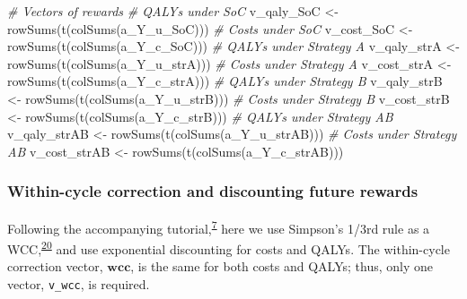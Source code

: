 \documentclass[
]{article}
\newenvironment{Shaded}{\begin{snugshade}}{\end{snugshade}}
\newcommand{\CommentTok}[1]{\textcolor[rgb]{0.56,0.35,0.01}{\textit{#1}}}
\newcommand{\FunctionTok}[1]{\textcolor[rgb]{0.00,0.00,0.00}{#1}}
\newcommand{\NormalTok}[1]{#1}
\newcommand{\OtherTok}[1]{\textcolor[rgb]{0.56,0.35,0.01}{#1}}
\begin{document}
\begin{Shaded}
\begin{Highlighting}[]
\CommentTok{\# Vectors of rewards}
\CommentTok{\# QALYs under SoC}
\NormalTok{v\_qaly\_SoC }\OtherTok{\textless{}{-}} \FunctionTok{rowSums}\NormalTok{(}\FunctionTok{t}\NormalTok{(}\FunctionTok{colSums}\NormalTok{(a\_Y\_u\_SoC)))}
\CommentTok{\# Costs under SoC}
\NormalTok{v\_cost\_SoC }\OtherTok{\textless{}{-}} \FunctionTok{rowSums}\NormalTok{(}\FunctionTok{t}\NormalTok{(}\FunctionTok{colSums}\NormalTok{(a\_Y\_c\_SoC)))}
\CommentTok{\# QALYs under Strategy A}
\NormalTok{v\_qaly\_strA }\OtherTok{\textless{}{-}} \FunctionTok{rowSums}\NormalTok{(}\FunctionTok{t}\NormalTok{(}\FunctionTok{colSums}\NormalTok{(a\_Y\_u\_strA)))}
\CommentTok{\# Costs under Strategy A}
\NormalTok{v\_cost\_strA }\OtherTok{\textless{}{-}} \FunctionTok{rowSums}\NormalTok{(}\FunctionTok{t}\NormalTok{(}\FunctionTok{colSums}\NormalTok{(a\_Y\_c\_strA)))}
\CommentTok{\# QALYs under Strategy B}
\NormalTok{v\_qaly\_strB }\OtherTok{\textless{}{-}} \FunctionTok{rowSums}\NormalTok{(}\FunctionTok{t}\NormalTok{(}\FunctionTok{colSums}\NormalTok{(a\_Y\_u\_strB)))}
\CommentTok{\# Costs under Strategy B}
\NormalTok{v\_cost\_strB }\OtherTok{\textless{}{-}} \FunctionTok{rowSums}\NormalTok{(}\FunctionTok{t}\NormalTok{(}\FunctionTok{colSums}\NormalTok{(a\_Y\_c\_strB)))}
\CommentTok{\# QALYs under Strategy AB}
\NormalTok{v\_qaly\_strAB }\OtherTok{\textless{}{-}} \FunctionTok{rowSums}\NormalTok{(}\FunctionTok{t}\NormalTok{(}\FunctionTok{colSums}\NormalTok{(a\_Y\_u\_strAB)))}
\CommentTok{\# Costs under Strategy AB}
\NormalTok{v\_cost\_strAB }\OtherTok{\textless{}{-}} \FunctionTok{rowSums}\NormalTok{(}\FunctionTok{t}\NormalTok{(}\FunctionTok{colSums}\NormalTok{(a\_Y\_c\_strAB)))}
\end{Highlighting}
\end{Shaded}

\hypertarget{within-cycle-correction-and-discounting-future-rewards}{%
\subsubsection{Within-cycle correction and discounting future rewards}\label{within-cycle-correction-and-discounting-future-rewards}}

Following the accompanying tutorial,\textsuperscript{\protect\hyperlink{ref-Alarid-Escudero2021a}{7}} here we use Simpson's 1/3rd rule as a WCC,\textsuperscript{\protect\hyperlink{ref-Elbasha2016a}{20}} and use exponential discounting for costs and QALYs. The within-cycle correction vector, \(\mathbf{wcc}\), is the same for both costs and QALYs; thus, only one vector, \texttt{v\_wcc}, is required.
\end{document}
